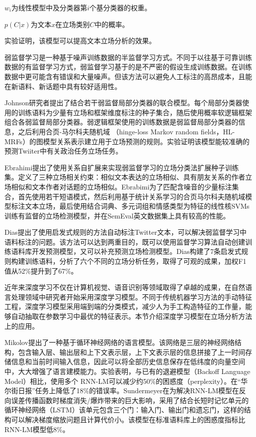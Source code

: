 $w_i$为线性模型中及分类器第$i$个基分类器的权重。

$p(C|x)$为文本$x$在立场类别$C$中的概率。

实验证明，该模型可以提高文本立场分析的效果。


弱监督学习是一种基于噪声训练数据的半监督学习方式。不同于以往基于可靠训练数据的有监督学习方式，弱监督学习基于的是不严密的假设生成训练数据。在训练数据中更可能含有错误和大量噪声。但该方法可以避免人工标注的高昂成本，且能在新语料、新话题中具有较好适用性。

Johnson研究者提出了结合若干弱监督局部分类器的联合模型。每个局部分类器使用的训练语料为少量有立场和框架维度标注的种子集合，随后使用概率软逻辑框架组合各弱监督局部分类器。弱逻辑框架使用的训练数据是弱监督局部分类器的信息，之后利用合页-马尔科夫随机域 （hinge-loss Markov random fields，HL- MRFs）的图模型关系表示建立用于立场预测的规则。实验证明该模型能较准确的预测Twiiter中有关政治任务立场任务。

Ebrahimi提出了使用关系自扩展来实现弱监督学习的立场分类法扩展种子训练集。定义了三种立场相关约束：相似文本表达的立场相似、具有朋友关系的作者立场相似和文本作者对话题的立场相似。Ebrabimi为了匹配含噪音的少量标注集合，首先使用若干短语模式，然后利用基于统计关系学习的合页马尔科夫随机域模型标注文本立场，最后使用结合词典、多元词组和情感类型为特征的线性核SVMs训练有监督的立场检测模型，并在SemEval英文数据集上具有较高的性能。

Dias提出了使用启发式规则的方法自动标注Twitter文本，可以解决弱监督学习中语料标注的问题。该方法可以达到两重目的，既可以使用监督学习算法自动创建训练语料库开发预测模型，又可以补充预测立场检测模型。Dias构建了7条启发式规则构建训练语料，分析了六个不同的立场分析任务，取得了可观的成果，加权F1值从52\%提升到了67\%。



近年来深度学习不仅在计算机视觉、语音识别等领域取得了卓越的成果，在自然语言处理领域中研究者开始采用深度学习模型。不同于传统机器学习方法的手动特征工程，深度学习模型采用端到端的分类模式，减少人为手工构造特征的工作量，能够自动抽取在参数学习中最优的特征表示。本节介绍深度学习模型在立场分析方法上的应用。

Mikolov提出了一种基于循环神经网络的语言模型。该网络是三层的神经网络结构，包含输入层、输出层和上下文表示层，上下文表示层的信息拼接了上一时间存储信息和当前时间输入信息，因此可以将全部历史信息保存在低纬度的向量空间中，大大增强了语言建模能力。实验表明，与已有的退避模型（Backoff Language Model）相比，使用多个 RNN-LM可以减少约50\%的困惑度（perplexity）。在“华尔街日报”任务上降低了18\%的错误率。Sundermeyer在为解决RNN-LM模型在反向误差传播函数时梯度消失/爆炸带来的巨大影响，采用了结合长短时记忆单元的循环神经网络（LSTM）该单元包含三个门：输入门、输出门和遗忘门，这样的结构可以解决梯度缩放问题且计算代价小。该模型在标准语料库上的困惑度指标比RNN-LM模型低8\%。

